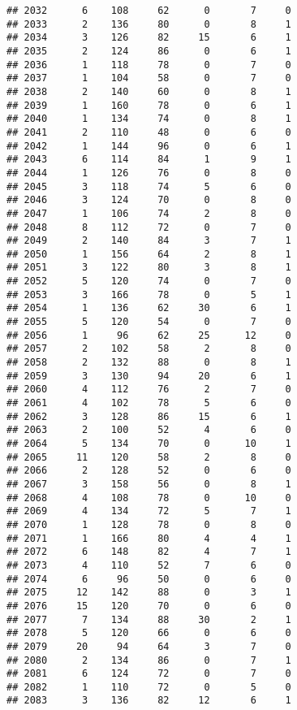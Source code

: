 \documentclass[
]{article}
\begin{document}
\begin{verbatim}
## 2032      6    108     62      0       7     0
## 2033      2    136     80      0       8     1
## 2034      3    126     82     15       6     1
## 2035      2    124     86      0       6     1
## 2036      1    118     78      0       7     0
## 2037      1    104     58      0       7     0
## 2038      2    140     60      0       8     1
## 2039      1    160     78      0       6     1
## 2040      1    134     74      0       8     1
## 2041      2    110     48      0       6     0
## 2042      1    144     96      0       6     1
## 2043      6    114     84      1       9     1
## 2044      1    126     76      0       8     0
## 2045      3    118     74      5       6     0
## 2046      3    124     70      0       8     0
## 2047      1    106     74      2       8     0
## 2048      8    112     72      0       7     0
## 2049      2    140     84      3       7     1
## 2050      1    156     64      2       8     1
## 2051      3    122     80      3       8     1
## 2052      5    120     74      0       7     0
## 2053      3    166     78      0       5     1
## 2054      1    136     62     30       6     1
## 2055      5    120     54      0       7     0
## 2056      1     96     62     25      12     0
## 2057      2    102     58      2       8     0
## 2058      2    132     88      0       8     1
## 2059      3    130     94     20       6     1
## 2060      4    112     76      2       7     0
## 2061      4    102     78      5       6     0
## 2062      3    128     86     15       6     1
## 2063      2    100     52      4       6     0
## 2064      5    134     70      0      10     1
## 2065     11    120     58      2       8     0
## 2066      2    128     52      0       6     0
## 2067      3    158     56      0       8     1
## 2068      4    108     78      0      10     0
## 2069      4    134     72      5       7     1
## 2070      1    128     78      0       8     0
## 2071      1    166     80      4       4     1
## 2072      6    148     82      4       7     1
## 2073      4    110     52      7       6     0
## 2074      6     96     50      0       6     0
## 2075     12    142     88      0       3     1
## 2076     15    120     70      0       6     0
## 2077      7    134     88     30       2     1
## 2078      5    120     66      0       6     0
## 2079     20     94     64      3       7     0
## 2080      2    134     86      0       7     1
## 2081      6    124     72      0       7     0
## 2082      1    110     72      0       5     0
## 2083      3    136     82     12       6     1

\end{verbatim}
\end{document}
